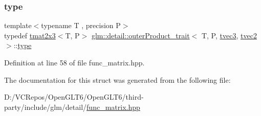 \subsubsection{\texorpdfstring{type}{type}}
{\footnotesize\ttfamily template$<$typename T , precision P$>$ \\
typedef \mbox{\hyperlink{structglm_1_1tmat2x3}{tmat2x3}}$<$T, P$>$ \mbox{\hyperlink{structglm_1_1detail_1_1outer_product__trait}{glm\+::detail\+::outer\+Product\+\_\+trait}}$<$ T, P, \mbox{\hyperlink{structglm_1_1tvec3}{tvec3}}, \mbox{\hyperlink{structglm_1_1tvec2}{tvec2}} $>$\+::\mbox{\hyperlink{structglm_1_1detail_1_1outer_product__trait_3_01_t_00_01_p_00_01tvec3_00_01tvec2_01_4_a32c937f071826a01c5e1d80ef32f8740}{type}}}



Definition at line 58 of file func\+\_\+matrix.\+hpp.



The documentation for this struct was generated from the following file\+:\begin{DoxyCompactItemize}
\item 
D\+:/\+V\+C\+Repos/\+Open\+G\+L\+T6/\+Open\+G\+L\+T6/third-\/party/include/glm/detail/\mbox{\hyperlink{func__matrix_8hpp}{func\+\_\+matrix.\+hpp}}\end{DoxyCompactItemize}
